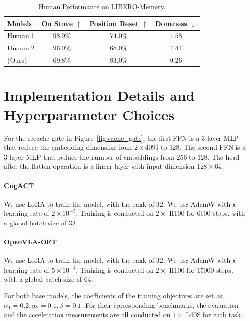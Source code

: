 \begin{table}[H]
    \centering
    \caption{Human Performance on LIBERO-Memory.}
    \label{tab:stove_human}
    \begin{tabular}{lccc}
    \toprule
        Models & On Stove $\uparrow$ & Position Reset $\uparrow$ & Doneness $\downarrow$ \\
    \midrule
    Human 1 & $98.0\%$  & $74.0\%$ & $1.58$ \\
        Human 2 & $96.0\%$ & $68.0\%$ & $1.44$\\
        \dysta{} (Ours) & $69.8\%$ & $83.0\%$ &  $0.26$ \\
    \bottomrule
    \end{tabular}
\end{table}

\section{Implementation Details and Hyperparameter Choices}
\label{app:impl}
For the recache gate in Figure~\ref{fig:cache_gate}, the first FFN is a $3$-layer MLP that reduce the embedding dimension from $2\times4096$ to $128$. The second FFN is a $3$-layer MLP that reduce the number of embeddings from $256$ to $128$. The head after the flatten operation is a linear layer with input dimension $128 \times 64$.
 
\paragraph{CogACT} We use LoRA \cite{hu2021loralowrankadaptationlarge} to train the model, with the rank of $32$. We use AdamW \cite{loshchilov2019decoupledweightdecayregularization} with a learning rate of $2\times 10^{-5}$. Training is conducted on $2\times$ H100 for $6000$ steps, with a global batch size of $32$. 
\paragraph{OpenVLA-OFT} We use LoRA \cite{hu2021loralowrankadaptationlarge} to train the model, with the rank of $32$. We use AdamW \cite{loshchilov2019decoupledweightdecayregularization} with a learning rate of $5\times 10^{-4}$. Training is conducted on $2\times$ H100 for $15000$ steps, with a global batch size of $64$. 

For both base models, the coefficients of the training objectives are set as $\alpha_1=0.2, \alpha_2=0.1, \beta=0.1$. For their corresponding benchmarks, the evaluation and the acceleration measurements are all conducted on $1\times$ L40S for each task.

